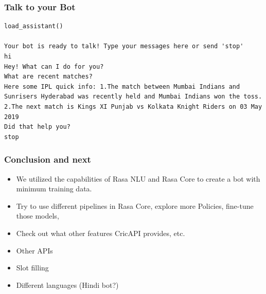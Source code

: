  \begin{frame}[fragile]\frametitle{Talk to your Bot}

\begin{lstlisting}
load_assistant() 

Your bot is ready to talk! Type your messages here or send 'stop'
hi
Hey! What can I do for you?
What are recent matches?
Here some IPL quick info: 1.The match between Mumbai Indians and Sunrisers Hyderabad was recently held and Mumbai Indians won the toss.
2.The next match is Kings XI Punjab vs Kolkata Knight Riders on 03 May 2019
Did that help you?
stop
\end{lstlisting}

\end{frame}

 \begin{frame}[fragile]\frametitle{Conclusion and next}

\begin{itemize}
\item We utilized the capabilities of Rasa NLU and Rasa Core to create a bot with minimum training data.
\item Try to use different pipelines in Rasa Core, explore more Policies, fine-tune those models,
\item Check out what other features CricAPI provides, etc.
\item Other APIs
\item Slot filling
\item Different languages (Hindi bot?) 
\end{itemize}

\end{frame}